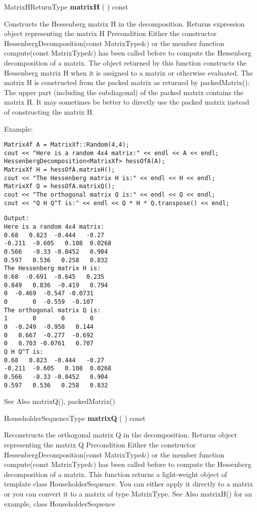 \vspace{0.3cm}
MatrixHReturnType \textbf{matrixH}  ( )  const 

Constructs the Hessenberg matrix H in the decomposition. 
Returns
expression object representing the matrix H
Precondition
Either the constructor HessenbergDecomposition(const MatrixType\&) or the member function compute(const MatrixType\&) has been called before to compute the Hessenberg decomposition of a matrix.
The object returned by this function constructs the Hessenberg matrix H when it is assigned to a matrix or otherwise evaluated. The matrix H is constructed from the packed matrix as returned by packedMatrix(): The upper part (including the subdiagonal) of the packed matrix contains the matrix H. It may sometimes be better to directly use the packed matrix instead of constructing the matrix H.


Example:
\begin{lstlisting}
Matrix4f A = MatrixXf::Random(4,4);
cout << "Here is a random 4x4 matrix:" << endl << A << endl;
HessenbergDecomposition<MatrixXf> hessOfA(A);
MatrixXf H = hessOfA.matrixH();
cout << "The Hessenberg matrix H is:" << endl << H << endl;
MatrixXf Q = hessOfA.matrixQ();
cout << "The orthogonal matrix Q is:" << endl << Q << endl;
cout << "Q H Q^T is:" << endl << Q * H * Q.transpose() << endl;
\end{lstlisting}

\begin{verbatim}
Output:
Here is a random 4x4 matrix:
0.68   0.823  -0.444   -0.27
-0.211  -0.605   0.108  0.0268
0.566   -0.33 -0.0452   0.904
0.597   0.536   0.258   0.832
The Hessenberg matrix H is:
0.68  -0.691  -0.645   0.235
0.849   0.836  -0.419   0.794
0  -0.469  -0.547 -0.0731
0       0  -0.559  -0.107
The orthogonal matrix Q is:
1       0       0       0
0  -0.249  -0.958   0.144
0   0.667  -0.277  -0.692
0   0.703 -0.0761   0.707
Q H Q^T is:
0.68   0.823  -0.444   -0.27
-0.211  -0.605   0.108  0.0268
0.566   -0.33 -0.0452   0.904
0.597   0.536   0.258   0.832	
\end{verbatim}

See Also
matrixQ(), packedMatrix() 


\vspace{0.3cm}
HouseholderSequenceType \textbf{matrixQ}  ( )  const 

Reconstructs the orthogonal matrix Q in the decomposition. 
Returns
object representing the matrix Q
Precondition
Either the constructor HessenbergDecomposition(const MatrixType\&) or the member function compute(const MatrixType\&) has been called before to compute the Hessenberg decomposition of a matrix.
This function returns a light-weight object of template class HouseholderSequence. You can either apply it directly to a matrix or you can convert it to a matrix of type MatrixType.
See Also
matrixH() for an example, class HouseholderSequence 


